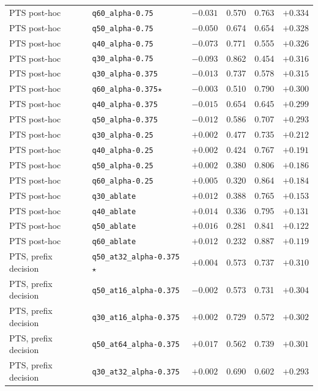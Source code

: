 {\begin{longtable}{l|l|c|cc|c}
PTS post-hoc & \texttt{q60\_alpha-0.75} & $-0.031$ & 0.570 & 0.763 & $+0.334$ \\
PTS post-hoc & \texttt{q50\_alpha-0.75} & $-0.050$ & 0.674 & 0.654 & $+0.328$ \\
PTS post-hoc & \texttt{q40\_alpha-0.75} & $-0.073$ & 0.771 & 0.555 & $+0.326$ \\
PTS post-hoc & \texttt{q30\_alpha-0.75} & $-0.093$ & 0.862 & 0.454 & $+0.316$ \\
PTS post-hoc & \texttt{q30\_alpha-0.375} & $-0.013$ & 0.737 & 0.578 & $+0.315$ \\
PTS post-hoc & \texttt{q60\_alpha-0.375}$\star$ & $-0.003$ & 0.510 & 0.790 & $+0.300$ \\
PTS post-hoc & \texttt{q40\_alpha-0.375} & $-0.015$ & 0.654 & 0.645 & $+0.299$ \\
PTS post-hoc & \texttt{q50\_alpha-0.375} & $-0.012$ & 0.586 & 0.707 & $+0.293$ \\
PTS post-hoc & \texttt{q30\_alpha-0.25} & $+0.002$ & 0.477 & 0.735 & $+0.212$ \\
PTS post-hoc & \texttt{q40\_alpha-0.25} & $+0.002$ & 0.424 & 0.767 & $+0.191$ \\
PTS post-hoc & \texttt{q50\_alpha-0.25} & $+0.002$ & 0.380 & 0.806 & $+0.186$ \\
PTS post-hoc & \texttt{q60\_alpha-0.25} & $+0.005$ & 0.320 & 0.864 & $+0.184$ \\
PTS post-hoc & \texttt{q30\_ablate} & $+0.012$ & 0.388 & 0.765 & $+0.153$ \\
PTS post-hoc & \texttt{q40\_ablate} & $+0.014$ & 0.336 & 0.795 & $+0.131$ \\
PTS post-hoc & \texttt{q50\_ablate} & $+0.016$ & 0.281 & 0.841 & $+0.122$ \\
PTS post-hoc & \texttt{q60\_ablate} & $+0.012$ & 0.232 & 0.887 & $+0.119$ \\
PTS, prefix decision & \texttt{q50\_at32\_alpha-0.375}$\star$ & $+0.004$ & 0.573 & 0.737 & $+0.310$ \\
PTS, prefix decision & \texttt{q50\_at16\_alpha-0.375} & $-0.002$ & 0.573 & 0.731 & $+0.304$ \\
PTS, prefix decision & \texttt{q30\_at16\_alpha-0.375} & $+0.002$ & 0.729 & 0.572 & $+0.302$ \\
PTS, prefix decision & \texttt{q50\_at64\_alpha-0.375} & $+0.017$ & 0.562 & 0.739 & $+0.301$ \\
PTS, prefix decision & \texttt{q30\_at32\_alpha-0.375} & $+0.002$ & 0.690 & 0.602 & $+0.293$ \\

\end{longtable}}
